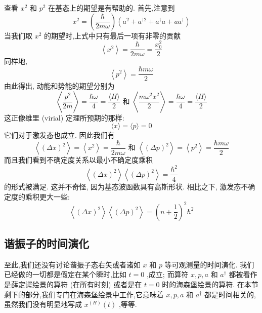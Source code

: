 \documentclass[lang=cn,newtx,10pt,scheme=chinese,thmcnt=section]{elegantbook}
\begin{document}
查看 ${x}^{2}$ 和 ${p}^{2}$ 在基态上的期望是有帮助的. 首先,注意到
\begin{equation}
	{x}^{2} = \left( \frac{\hbar }{2m\omega }\right) \left( {{a}^{2} + {a}^{\dagger 2} + {a}^{ \dagger }a + a{a}^{ \dagger }}\right)
\end{equation}
当我们取 ${x}^{2}$ 的期望时,上式中只有最后一项有非零的贡献
\begin{equation}
	\left\langle {x}^{2}\right\rangle = \frac{\hbar }{2m\omega } = \frac{{x}_{0}^{2}}{2}
\end{equation}
同样地,
\begin{equation}
	\left\langle {p}^{2}\right\rangle = \frac{\hbar {m\omega }}{2}
\end{equation}
由此得出, 动能和势能的期望分别为
\begin{equation}
	\left\langle \frac{{p}^{2}}{2m}\right\rangle = \frac{\hbar \omega }{4} = \frac{\langle H\rangle }{2}\text{ 和 }\left\langle \frac{m{\omega }^{2}{x}^{2}}{2}\right\rangle = \frac{\hbar \omega }{4} = \frac{\langle H\rangle }{2}
\end{equation}
这正像维里 (virial) 定理所预期的那样:
\begin{equation}
	\langle x\rangle = \langle p\rangle = 0
\end{equation}
它们对于激发态也成立. 因此我们有
\begin{equation}
	\left\langle {\left( \Delta x\right) }^{2}\right\rangle = \left\langle {x}^{2}\right\rangle = \frac{\hbar }{2m\omega }\text{ 和 }\left\langle {\left( \Delta p\right) }^{2}\right\rangle = \left\langle {p}^{2}\right\rangle = \frac{\hbar {m\omega }}{2}
\end{equation}
而且我们看到不确定度关系以最小不确定度乘积
\begin{equation}
	\left\langle {\left( \Delta x\right) }^{2}\right\rangle \left\langle {\left( \Delta p\right) }^{2}\right\rangle = \frac{{\hbar }^{2}}{4}
\end{equation}
的形式被满足. 这并不奇怪, 因为基态波函数具有高斯形状. 相比之下, 激发态不确定度的乘积更大一些:
\begin{equation}
	\left\langle {\left( \Delta x\right) }^{2}\right\rangle \left\langle {\left( \Delta p\right) }^{2}\right\rangle = {\left( n + \frac{1}{2}\right) }^{2}{\hbar }^{2}
\end{equation}
\subsection*{谐振子的时间演化}
至此,我们还没有讨论谐振子态右矢或者诸如 $x$ 和 $p$ 等可观测量的时间演化. 我们已经做的一切都是假定在某个瞬时,比如 $t = 0$ ,成立; 而算符 $x, p, a$ 和 ${a}^{ \dagger }$ 都被看作是薛定谔绘景的算符 (在所有时刻) 或者是在 $t = 0$ 时的海森堡绘景的算符. 在本节剩下的部分,我们专门在海森堡绘景中工作,它意味着 $x, p, a$ 和 ${a}^{ \dagger }$ 都是时间相关的,虽然我们没有明显地写成 ${x}^{\left( H\right) }\left( t\right)$ ,等等.
\end{document}
